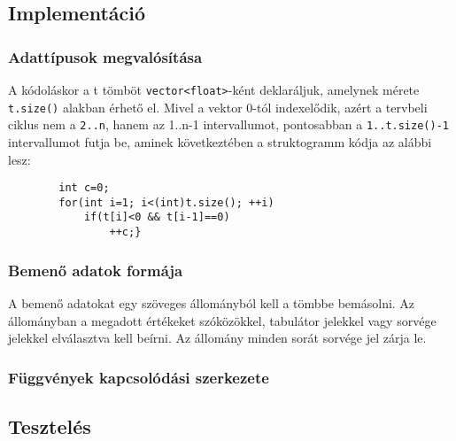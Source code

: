 \documentclass[a4paper]{article}
\begin{document}
    \subsection{Implementáció}
        \subsubsection{Adattípusok megvalósítása}
        A kódoláskor a t tömböt \texttt{vector<float>}-ként deklaráljuk, amelynek mérete \texttt{t.size()} alakban érhető el. Mivel a vektor 0-tól indexelődik, azért a tervbeli ciklus nem a \texttt{2..n}, hanem az 1..n-1 intervallumot, pontosabban a \texttt{1..t.size()-1} intervallumot futja be, aminek következtében a struktogramm kódja az alábbi lesz:
        \begin{lstlisting}
        int c=0;
        for(int i=1; i<(int)t.size(); ++i)
            if(t[i]<0 && t[i-1]==0)
                ++c;}
        \end{lstlisting}
        \subsubsection{Bemenő adatok formája}
        A bemenő adatokat egy szöveges állományból kell a tömbbe bemásolni. Az állományban a megadott értékeket szóközökkel, tabulátor jelekkel vagy sorvége jelekkel elválasztva kell beírni. Az állomány minden sorát sorvége jel zárja le.
      \subsubsection{Függvények kapcsolódási szerkezete}
    \subsection{Tesztelés}
\end{document}
